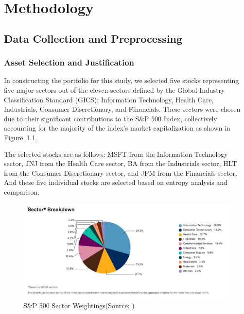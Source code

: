 
\chapter{Methodology}\label{chapter:methodology}

\section{Data Collection and Preprocessing}

\subsection{Asset Selection and Justification}


In constructing the portfolio for this study, we selected five stocks representing five major sectors out of the eleven sectors defined by the Global Industry Classification Standard (GICS): Information Technology, Health Care, Industrials, Consumer Discretionary, and Financials. These sectors were chosen due to their significant contributions to the S\&P 500 Index, collectively accounting for the majority of the index's market capitalization as shown in Figure~\ref{fig:sector_sp}.

The selected stocks are as follows: \ac{MSFT} from the Information Technology sector, \ac{JNJ} from the Health Care sector, \ac{BA} from the Industrials sector, \ac{HLT} from the Consumer Discretionary sector, and \ac{JPM} from the Financials sector. And these five individual stocks are selected based on entropy analysis and comparison.

\begin{figure}[htbp]
    \centering
    \includegraphics[width=1.0\textwidth]{figures/Sector-SP.jpg}
    \caption{S\&P 500 Sector Weightings(Source: \cite{SP500SectorWeights2024}) }
    \label{fig:sector_sp}
\end{figure}

